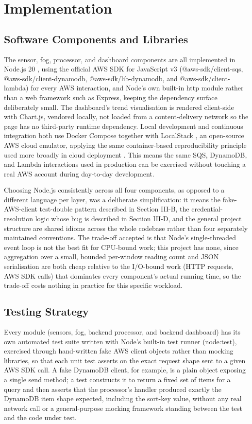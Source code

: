 \documentclass[conference]{IEEEtran}
\begin{document}
\section{Implementation}

\subsection{Software Components and Libraries}
The sensor, fog, processor, and dashboard components are all implemented in Node.js 20 \cite{ref18}, using the official AWS SDK for JavaScript v3 (@aws-sdk/client-sqs, @aws-sdk/client-dynamodb, @aws-sdk/lib-dynamodb, and @aws-sdk/client-lambda) for every AWS interaction, and Node's own built-in http module rather than a web framework such as Express, keeping the dependency surface deliberately small. The dashboard's trend visualisation is rendered client-side with Chart.js, vendored locally, not loaded from a content-delivery network so the page has no third-party runtime dependency. Local development and continuous integration both use Docker Compose \cite{ref19} together with LocalStack \cite{ref20}, an open-source AWS cloud emulator, applying the same container-based reproducibility principle used more broadly in cloud deployment \cite{ref21}. This means the same SQS, DynamoDB, and Lambda interactions used in production can be exercised without touching a real AWS account during day-to-day development.

Choosing Node.js consistently across all four components, as opposed to a different language per layer, was a deliberate simplification: it means the fake-AWS-client test-double pattern described in Section III-B, the credential-resolution logic whose bug is described in Section III-D, and the general project structure are shared idioms across the whole codebase rather than four separately maintained conventions. The trade-off accepted is that Node's single-threaded event loop is not the best fit for CPU-bound work; this project has none, since aggregation over a small, bounded per-window reading count and JSON serialisation are both cheap relative to the I/O-bound work (HTTP requests, AWS SDK calls) that dominates every component's actual running time, so the trade-off costs nothing in practice for this specific workload.

\subsection{Testing Strategy}
Every module (sensors, fog, backend processor, and backend dashboard) has its own automated test suite written with Node's built-in test runner (node:test), exercised through hand-written fake AWS client objects rather than mocking libraries, so that each unit test asserts on the exact request shape sent to a given AWS SDK call. A fake DynamoDB client, for example, is a plain object exposing a single send method; a test constructs it to return a fixed set of items for a query and then asserts that the processor's handler produced exactly the DynamoDB item shape expected, including the sort-key value, without any real network call or a general-purpose mocking framework standing between the test and the code under test.
\end{document}
